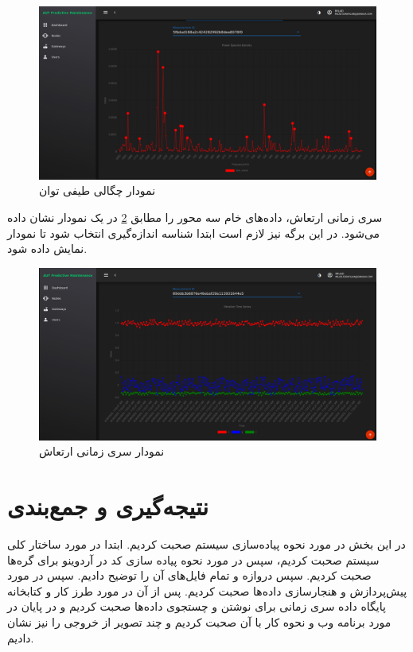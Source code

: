 \begin{figure}[!h]
\centering\includegraphics[scale=.38]{psd_chart.png}
\caption{نمودار چگالی طیفی توان}\label{fig:psd_chart}
\end{figure}

سری زمانی ارتعاش، داده‌های خام سه محور را مطابق \cref{fig:vdt_chart} در یک نمودار نشان داده می‌شود. در این برگه نیز لازم است ابتدا شناسه اندازه‌گیری انتخاب شود تا نمودار نمایش داده شود.

\begin{figure}[!h]
\centering\includegraphics[scale=.38]{vdt_chart.png}
\caption{نمودار سری زمانی ارتعاش}\label{fig:vdt_chart}
\end{figure}

\section{نتیجه‌گیری و جمع‌بندی}

در این بخش در مورد نحوه پیاده‌سازی سیستم صحبت کردیم. ابتدا در مورد ساختار کلی سیستم صحبت کردیم، سپس در مورد نحوه پیاده سازی کد در آردوینو برای گره‌ها صحبت کردیم. سپس دروازه و تمام فایل‌های آن را توضیح دادیم. سپس در مورد پیش‌پردازش و هنجارسازی داده‌ها صحبت کردیم. پس از آن در مورد طرز کار و کتابخانه پایگاه داده سری زمانی برای نوشتن و چستجوی داده‌ها صحبت کردیم و در پایان در مورد برنامه وب و نحوه کار با آن صحبت کردیم و چند تصویر از خروجی را نیز نشان دادیم.
